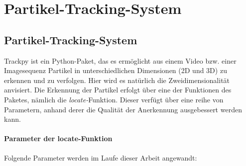 \chapter{Partikel-Tracking-System}

\section{Partikel-Tracking-System}
Trackpy ist ein Python-Paket, das es ermöglicht aus einem Video bzw. einer Imagesequenz Partikel in unterschiedlichen Dimensionen (2D und 3D) zu erkennen und zu verfolgen. Hier wird es natürlich die Zweidimensionalität anvisiert. Die Erkennung der Partikel erfolgt über eine der Funktionen des Paketes, nämlich die \textit{locate-}Funktion.
Dieser verfügt über eine reihe von Parametern, anhand derer die Qualität der Anerkennung ausgebessert werden kann.

	\subsubsection{Parameter der locate-Funktion}
		Folgende Parameter werden im Laufe dieser Arbeit angewandt:

